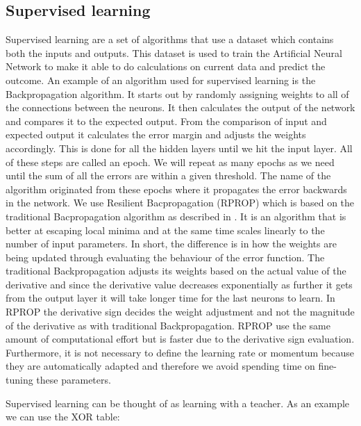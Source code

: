 \subsection{Supervised learning}
Supervised learning are a set of algorithms that use a dataset which contains both the inputs and outputs. This dataset is used to train the Artificial Neural Network to make it able to do calculations on current data and predict the outcome. An example of an algorithm used for supervised learning is the Backpropagation algorithm. 
It starts out by randomly assigning weights to all of the connections between the neurons. It then calculates the output of the network and compares it to the expected output. From the comparison of input and expected output it calculates the error margin and adjusts the weights accordingly. This is done for all the hidden layers until we hit the input layer. All of these steps are called an epoch. We will repeat as many epochs as we need until the sum of all the errors are within a given threshold. The name of the algorithm originated from these epochs where it propagates the error backwards in the network. We use Resilient Bacpropagation (RPROP) which is based on the traditional Bacpropagation algorithm as described in \cite{rpropForGeometricDilution,adaptiveRprop}. It is an algorithm that is better at escaping local minima and at the same time scales linearly to the number of input parameters. In short, the difference is in how the weights are being updated through evaluating the behaviour of the error function. The traditional Backpropagation adjusts its weights based on the actual value of the derivative and since the derivative value decreases exponentially as further it gets from the output layer it will take longer time for the last neurons to learn. In RPROP the derivative sign decides the weight adjustment and not the magnitude of the derivative as with traditional Backpropagation. RPROP use the same amount of computational effort but is faster due to the derivative sign evaluation. Furthermore, it is not necessary to define the learning rate or momentum because they are automatically adapted and therefore we avoid spending time on fine-tuning these parameters.

Supervised learning can be thought of as learning with a teacher. As an example we can use the XOR table:

